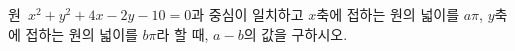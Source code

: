 원~$x^2+y^2+4x-2y-10=0$과 중심이 일치하고 $x$축에 접하는 원의 넓이를 $a\pi$, $y$축에 접하는 원의 넓이를 $b\pi$라 할 때, $a-b$의 값을 구하시오.

